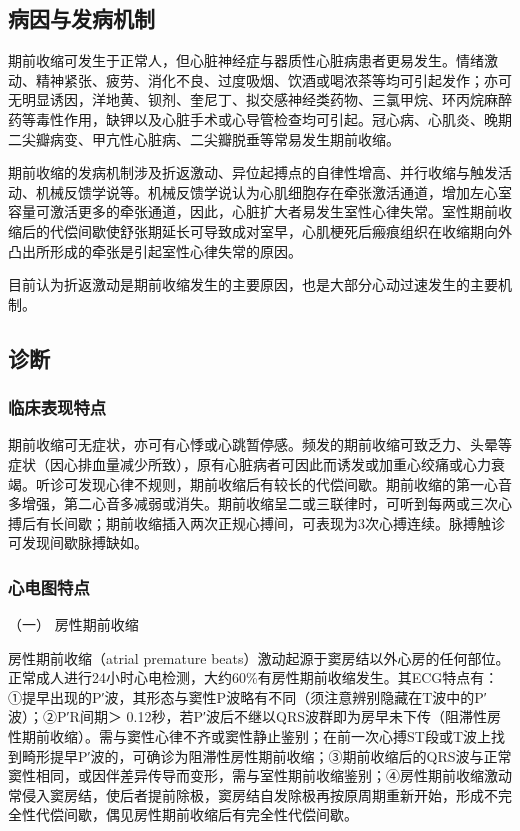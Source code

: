 \subsection{病因与发病机制}

期前收缩可发生于正常人，但心脏神经症与器质性心脏病患者更易发生。情绪激动、精神紧张、疲劳、消化不良、过度吸烟、饮酒或喝浓茶等均可引起发作；亦可无明显诱因，洋地黄、钡剂、奎尼丁、拟交感神经类药物、三氯甲烷、环丙烷麻醉药等毒性作用，缺钾以及心脏手术或心导管检查均可引起。冠心病、心肌炎、晚期二尖瓣病变、甲亢性心脏病、二尖瓣脱垂等常易发生期前收缩。

期前收缩的发病机制涉及折返激动、异位起搏点的自律性增高、并行收缩与触发活动、机械反馈学说等。机械反馈学说认为心肌细胞存在牵张激活通道，增加左心室容量可激活更多的牵张通道，因此，心脏扩大者易发生室性心律失常。室性期前收缩后的代偿间歇使舒张期延长可导致成对室早，心肌梗死后瘢痕组织在收缩期向外凸出所形成的牵张是引起室性心律失常的原因。

目前认为折返激动是期前收缩发生的主要原因，也是大部分心动过速发生的主要机制。

\subsection{诊断}

\subsubsection{临床表现特点}

期前收缩可无症状，亦可有心悸或心跳暂停感。频发的期前收缩可致乏力、头晕等症状（因心排血量减少所致），原有心脏病者可因此而诱发或加重心绞痛或心力衰竭。听诊可发现心律不规则，期前收缩后有较长的代偿间歇。期前收缩的第一心音多增强，第二心音多减弱或消失。期前收缩呈二或三联律时，可听到每两或三次心搏后有长间歇；期前收缩插入两次正规心搏间，可表现为3次心搏连续。脉搏触诊可发现间歇脉搏缺如。

\subsubsection{心电图特点}

\hypertarget{text00288.htmlux5cux23CHP10-2-1-2-2-1}{}
（一） 房性期前收缩

房性期前收缩（atrial premature
beats）激动起源于窦房结以外心房的任何部位。正常成人进行24小时心电检测，大约60\%有房性期前收缩发生。其ECG特点有：①提早出现的P′波，其形态与窦性P波略有不同（须注意辨别隐藏在T波中的P′波）；②P′R间期＞
0.12秒，若P′波后不继以QRS波群即为房早未下传（阻滞性房性期前收缩）。需与窦性心律不齐或窦性静止鉴别；在前一次心搏ST段或T波上找到畸形提早P′波的，可确诊为阻滞性房性期前收缩；③期前收缩后的QRS波与正常窦性相同，或因伴差异传导而变形，需与室性期前收缩鉴别；④房性期前收缩激动常侵入窦房结，使后者提前除极，窦房结自发除极再按原周期重新开始，形成不完全性代偿间歇，偶见房性期前收缩后有完全性代偿间歇。

